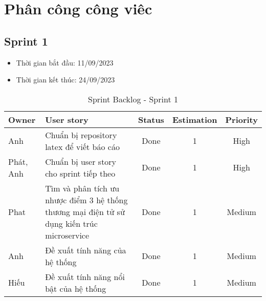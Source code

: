 \chapter{Phân công công viêc}
\section{Sprint 1}
\begin{itemize}
    \item Thời gian bắt đầu: 11/09/2023
    \item Thời gian kết thúc: 24/09/2023
\end{itemize}
\begin{table}[H]
    \begin{tabular}{|m{2.5cm}|m{6cm}|c|c|c|}
    \hline
    \textbf{Owner}  & \textbf{User story}                                & \textbf{Status} & \textbf{Estimation} & \textbf{Priority} \\ \hline
    Anh                  & Chuẩn bị repository latex để viết báo cáo                                     & Done            & 1                   & High              \\ \hline
    Phát, Anh            & Chuẩn bị user story cho sprint tiếp theo                                             & Done            & 1                   & High              \\ \hline
    Phat                 & Tìm và phân tích ưu nhược điểm 3 hệ thống thương mại điện tử sử dụng kiến trúc microservice  & Done            & 1                   & Medium            \\ \hline
    Anh                  & Đề xuất tính năng của hệ thống                               & Done            & 1                   & Medium            \\ \hline
    Hiếu                 & Đề xuất tính năng nổi bật của hệ thống                         & Done            & 1                   & Medium            \\ \hline
    \end{tabular}
    \caption{Sprint Backlog - Sprint 1}
    \label{tab:sprint-1}
\end{table}
